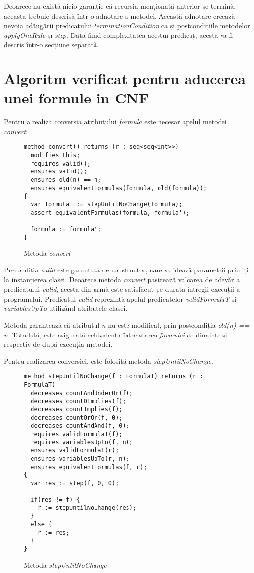 Deoarece nu există nicio garanție că recursia menționată anterior se termină, aceasta trebuie descrisă într-o adnotare a metodei. Această adnotare creează nevoia adăugării predicatului \textit{terminationCondition} ca și postcondițiile metodelor \textit{applyOneRule} și \textit{step}. Dată fiind complexitatea acestui predicat, acesta va fi descris într-o secțiune separată.

\section{Algoritm verificat pentru aducerea unei formule in CNF}

Pentru a realiza conversia atributului \textit{formula} este necesar apelul metodei \textit{convert}:

\begin{figure}[H]
    \caption{Metoda \textit{convert}}

\begin{Verbatim}[fontsize=\small, frame=single,baselinestretch=0.1]
method convert() returns (r : seq<seq<int>>)
  modifies this;
  requires valid();
  ensures valid();
  ensures old(n) == n;
  ensures equivalentFormulas(formula, old(formula));
{
  var formula' := stepUntilNoChange(formula);
  assert equivalentFormulas(formula, formula');

  formula := formula';
}
\end{Verbatim}
\end{figure}

Precondiția \textit{valid} este garantată de constructor, care validează parametrii primiți la instanțierea clasei. Deoarece metoda \textit{convert} pastrează valoarea de adevăr a predicatului \textit{valid}, acesta din urmă este satisfăcut pe durata întregii execuții a programului. Predicatul \textit{valid} reprezintă apelul predicatelor \textit{validFormulaT} și \textit{variablesUpTo} utilizând atributele clasei.

Metoda garantează că atributul \textit{n} nu este modificat, prin postcondiția \textit{old(n) == n}. Totodată, este asigurată echivalența între starea \textit{formulei} de dinainte și respectiv de după execuția metodei.

Pentru realizarea conversiei, este folosită metoda \textit{stepUntilNoChange}.

\begin{figure}[H]
    \caption{Metoda \textit{stepUntilNoChange}}

\begin{Verbatim}[fontsize=\small, frame=single,baselinestretch=0.1]
method stepUntilNoChange(f : FormulaT) returns (r : FormulaT)
  decreases countAndUnderOr(f);
  decreases countDImplies(f);
  decreases countImplies(f);
  decreases countOrOr(f, 0);
  decreases countAndAnd(f, 0);
  requires validFormulaT(f);
  requires variablesUpTo(f, n);
  ensures validFormulaT(r);
  ensures variablesUpTo(r, n);
  ensures equivalentFormulas(f, r);
{
  var res := step(f, 0, 0);

  if(res != f) {
    r := stepUntilNoChange(res);
  }
  else {
    r := res;
  }
}
\end{Verbatim}
\end{figure}

